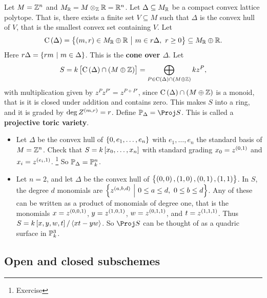 \pagebreak

\begin{example*}
Let $ M = \mathbb{Z}^n $ and $ M_{\mathbb{R}} = M \otimes_{\mathbb{Z}} \mathbb{R} = \mathbb{R}^n $. Let $ \Delta \subseteq M_{\mathbb{R}} $ be a compact convex lattice polytope. That is, there exists a finite set $ V \subseteq M $ such that $ \Delta $ is the convex hull of $ V $, that is the smallest convex set containing $ V $. Let
$$ \C\br{\Delta} = \cbr{\br{m, r} \in M_\RR \oplus \RR \st m \in r\Delta, \ r \ge 0} \subseteq M_\RR \oplus \RR. $$
Here $ r\Delta = \cbr{rm \st m \in \Delta} $. This is the \textbf{cone over $ \Delta $}. Let
$$ S = k\sbr{\C\br{\Delta} \cap \br{M \oplus \ZZ}} = \bigoplus_{P \in \C\br{\Delta} \cap \br{M \oplus \ZZ}} kz^P, $$
with multiplication given by $ z^Pz^{P'} = z^{P + P'} $, since $ \C\br{\Delta} \cap \br{M \oplus \ZZ} $ is a monoid, that is it is closed under addition and contains zero. This makes $ S $ into a ring, and it is graded by $ \deg Z^{\br{m, r}} = r $. Define $ \PP_\Delta = \Proj S $. This is called a \textbf{projective toric variety}.
\begin{itemize}
\item Let $ \Delta $ be the convex hull of $ \cbr{0, e_1, \dots, e_n} $ with $ e_1, \dots, e_n $ the standard basis of $ M = \mathbb{Z}^n $. Check that $ S = k\sbr{x_0, \dots, x_n} $ with standard grading $ x_0 = z^{\br{0, 1}} $ and $ x_i = z^{\br{e_i, 1}} $. \footnote{Exercise} So $ \mathbb{P}_\Delta = \mathbb{P}_k^n $.
\item Let $ n = 2 $, and let $ \Delta $ be the convex hull of $ \cbr{\br{0, 0}, \br{1, 0}, \br{0, 1}, \br{1, 1}} $. In $ S $, the degree $ d $ monomials are $ \cbr{z^{\br{a, b, d}} \st 0 \le a \le d, \ 0 \le b \le d} $. Any of these can be written as a product of monomials of degree one, that is the monomials $ x = z^{\br{0, 0, 1}} $, $ y = z^{\br{1, 0, 1}} $, $ w = z^{\br{0, 1, 1}} $, and $ t = z^{\br{1, 1, 1}} $. Thus $ S = k\sbr{x, y, w, t} / \abr{xt - yw} $. So $ \Proj S $ can be thought of as a quadric surface in $ \mathbb{P}_k^3 $.
\end{itemize}
\end{example*}

\subsection{Open and closed subschemes}


